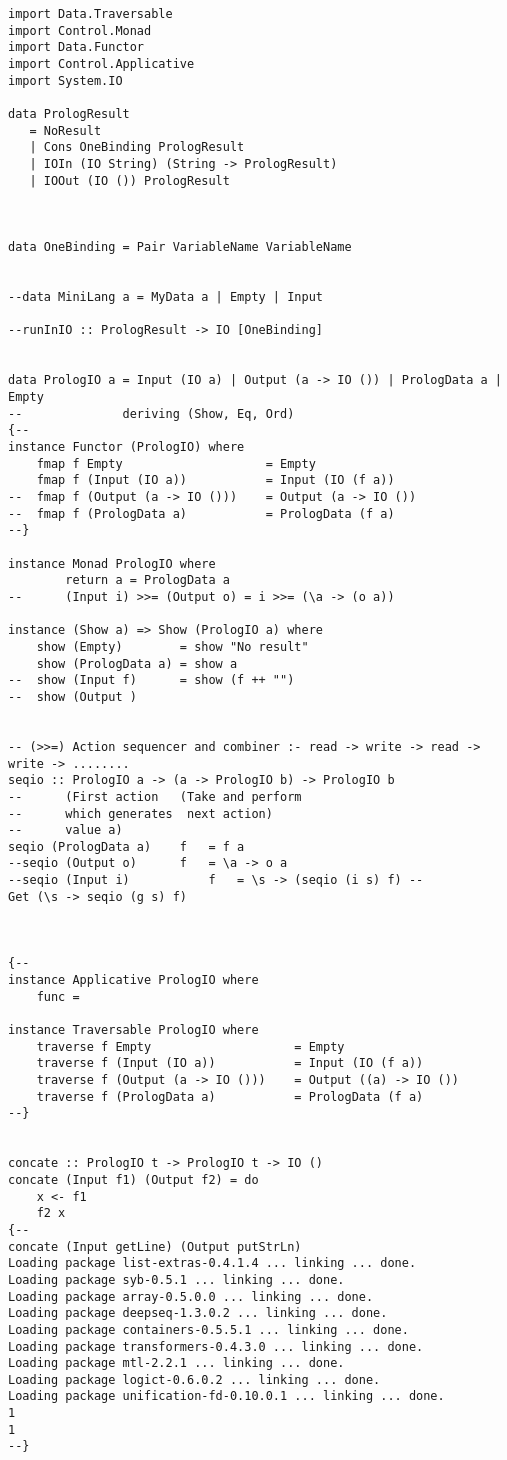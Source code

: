 \documentclass[thesis-solanki.tex]{subfiles}
\begin{document}
\begin{verbatim}
import Data.Traversable
import Control.Monad
import Data.Functor
import Control.Applicative
import System.IO

data PrologResult
   = NoResult
   | Cons OneBinding PrologResult 
   | IOIn (IO String) (String -> PrologResult)
   | IOOut (IO ()) PrologResult



data OneBinding = Pair VariableName VariableName


--data MiniLang a = MyData a | Empty | Input   

--runInIO :: PrologResult -> IO [OneBinding]


data PrologIO a = Input (IO a) | Output (a -> IO ()) | PrologData a | Empty 
--				deriving (Show, Eq, Ord)
{--
instance Functor (PrologIO) where
	fmap f Empty 					= Empty
	fmap f (Input (IO a)) 			= Input (IO (f a))
--	fmap f (Output (a -> IO ()))	= Output (a -> IO ())
--	fmap f (PrologData a)			= PrologData (f a)
--}

instance Monad PrologIO where
	 	return a = PrologData a
--	 	(Input i) >>= (Output o) = i >>= (\a -> (o a))

instance (Show a) => Show (PrologIO a) where
	show (Empty) 		= show "No result"
	show (PrologData a) = show a
--	show (Input f)		= show (f ++ "")
--	show (Output )		


-- (>>=) Action sequencer and combiner :- read -> write -> read -> write -> ........
seqio :: PrologIO a -> (a -> PrologIO b) -> PrologIO b
--      (First action   (Take and perform                       
--      which generates  next action)
--      value a) 
seqio (PrologData a) 	f 	= f a
--seqio (Output o) 		f 	= \a -> o a
--seqio (Input i)    		f 	= \s -> (seqio (i s) f) --				Get (\s -> seqio (g s) f)



{--
instance Applicative PrologIO where
	func =

instance Traversable PrologIO where
	traverse f Empty 					= Empty
	traverse f (Input (IO a)) 			= Input (IO (f a))
	traverse f (Output (a -> IO ()))	= Output ((a) -> IO ())
	traverse f (PrologData a)			= PrologData (f a)
--}


concate :: PrologIO t -> PrologIO t -> IO ()
concate (Input f1) (Output f2) = do
	x <- f1
	f2 x
{--
concate (Input getLine) (Output putStrLn)
Loading package list-extras-0.4.1.4 ... linking ... done.
Loading package syb-0.5.1 ... linking ... done.
Loading package array-0.5.0.0 ... linking ... done.
Loading package deepseq-1.3.0.2 ... linking ... done.
Loading package containers-0.5.5.1 ... linking ... done.
Loading package transformers-0.4.3.0 ... linking ... done.
Loading package mtl-2.2.1 ... linking ... done.
Loading package logict-0.6.0.2 ... linking ... done.
Loading package unification-fd-0.10.0.1 ... linking ... done.
1
1
--}

\end{verbatim}
\end{document}
